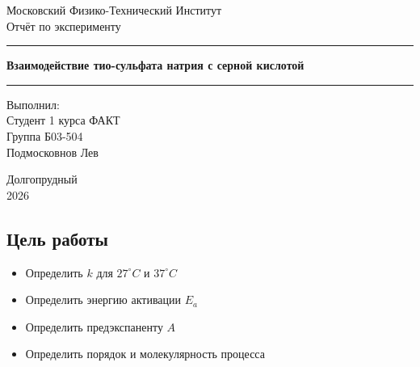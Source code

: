 \documentclass[a4paper, 12pt]{article}
\begin{document}

\begin{titlepage}
    \begin{center}

        \vspace*{5cm}

        {\Huge Московский Физико-Технический Институт}\\[2cm]

        {\LARGE Отчёт по эксперименту}\\[0.25cm]

        \noindent\rule{\textwidth}{1pt}
        \vspace*{-0.25cm}

        {\huge \textbf{Взаимодействие тио-сульфата натрия с серной кислотой}}

        \noindent\rule{\textwidth}{1pt}

        \vfill

    \end{center}

    \begin{flushright}
        \begin{minipage}{0.45\textwidth}
            {\Large
                Выполнил:\\
                Студент 1 курса ФАКТ\\
                Группа Б03-504\\
                Подмосковнов Лев
            }
        \end{minipage}
    \end{flushright}

    \vfill

    \begin{center}
        Долгопрудный\\2026
    \end{center}

\end{titlepage}
\restoregeometry

\setcounter{page}{2}

\subsection*{Цель работы}

\begin{itemize}[label=--]
    \item Определить $k$ для $27^\circ C$ и $37^\circ C$
    \item Определить энергию активации $E_a$
    \item Определить предэкспаненту $A$
    \item Определить порядок и молекулярность процесса
\end{itemize}
\end{document}
